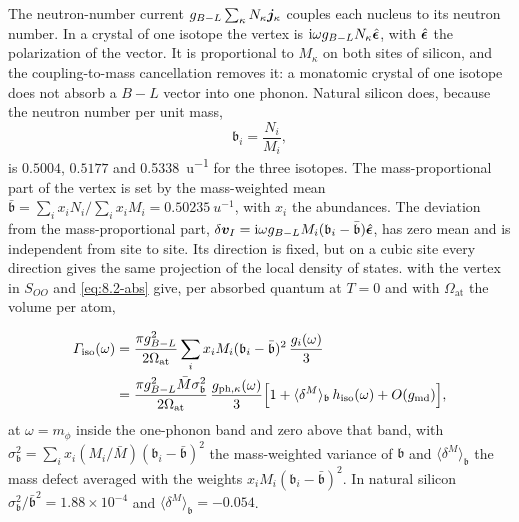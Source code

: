 The neutron-number current $g_{B-L}\sum_\kappa N_\kappa\bm{j}_\kappa$ couples each nucleus to its neutron number. In a crystal of one isotope the vertex is $\mathrm{i}\omega g_{B-L}N_\kappa\hat{\bm{\epsilon}}$, with $\hat{\bm{\epsilon}}$ the polarization of the vector. It is proportional to $M_\kappa$ on both sites of silicon, and the coupling-to-mass cancellation removes it: a monatomic crystal of one isotope does not absorb a $B - L$ vector into one phonon. Natural silicon does, because the neutron number per unit mass,
\begin{equation*}
  \mathfrak{b}_i = \frac{N_i}{M_i} ,
\end{equation*}
is $0.5004$, $0.5177$ and \SI{0.5338}{u^{-1}} for the three isotopes. The mass-proportional part of the vertex is set by the mass-weighted mean $\bar{\mathfrak{b}} = \sum_ix_iN_i/\sum_ix_iM_i = \SI{0.50235}{u^{-1}}$, with $x_i$ the abundances. The deviation from the mass-proportional part, $\delta\bm{v}_I = \mathrm{i}\omega g_{B-L}M_i(\mathfrak{b}_i - \bar{\mathfrak{b}})\hat{\bm{\epsilon}}$, has zero mean and is independent from site to site. Its direction is fixed, but on a cubic site every direction gives the same projection of the local density of states.  with the vertex in $S_{OO}$ and \cref{eq:8.2-abs} give, per absorbed quantum at $T = 0$ and with $\Omega_{\mathrm{at}}$ the volume per atom,
\begin{keyresult}
\begin{equation}
  \begin{aligned}
  \varGamma_{\mathrm{iso}}(\omega) &= \frac{\pi g_{B-L}^2}{2\Omega_{\mathrm{at}}}\sum_ix_iM_i(\mathfrak{b}_i - \bar{\mathfrak{b}})^2\,\frac{g_i(\omega)}{3} \\
  &= \frac{\pi g_{B-L}^2\bar M\sigma_{\mathfrak{b}}^2}{2\Omega_{\mathrm{at}}}\,\frac{g_{\mathrm{ph},\kappa}(\omega)}{3}\Bigl[1 + \langle\delta^M\rangle_{\mathfrak{b}}\,h_{\mathrm{iso}}(\omega) + O(g_{\mathrm{md}})\Bigr] ,
  \end{aligned}
  \label{eq:11.6-Giso}
\end{equation}
at $\omega = m_\phi$ inside the one-phonon band and zero above that band, with $\sigma_{\mathfrak{b}}^2 = \sum_ix_i(M_i/\bar M)(\mathfrak{b}_i - \bar{\mathfrak{b}})^2$ the mass-weighted variance of $\mathfrak{b}$ and $\langle\delta^M\rangle_{\mathfrak{b}}$ the mass defect averaged with the weights $x_iM_i(\mathfrak{b}_i - \bar{\mathfrak{b}})^2$. In natural silicon $\sigma_{\mathfrak{b}}^2/\bar{\mathfrak{b}}^2 = 1.88\times10^{-4}$ and $\langle\delta^M\rangle_{\mathfrak{b}} = -0.054$.
\end{keyresult}
